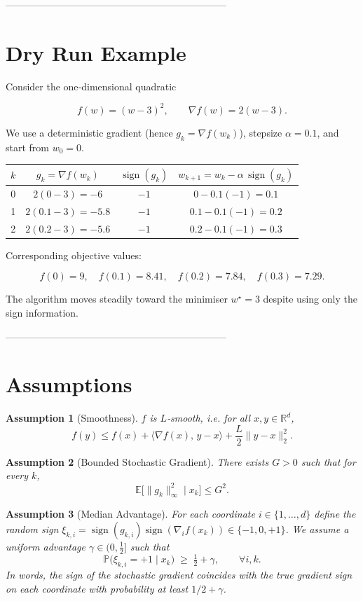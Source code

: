 \documentclass{article}
\newtheorem{assumption}{Assumption}
\newcommand{\sign}{\operatorname{sign}}
\begin{document}
--------------------------------------------------------------------

\section*{Dry Run Example}
Consider the one‑dimensional quadratic  

\[
f(w)=(w-3)^{2},\qquad \nabla f(w)=2(w-3).
\]

We use a deterministic gradient (hence $g_k=\nabla f(w_k)$), stepsize
$\alpha=0.1$, and start from $w_{0}=0$.

\begin{center}
\begin{tabular}{c|c|c|c}
$k$ & $g_k= \nabla f(w_k)$ & $\sign(g_k)$ & $w_{k+1}=w_k-\alpha\,\sign(g_k)$ \\ \hline
0 & $2(0-3)=-6$ & $-1$ & $0-0.1(-1)=0.1$ \\
1 & $2(0.1-3)=-5.8$ & $-1$ & $0.1-0.1(-1)=0.2$ \\
2 & $2(0.2-3)=-5.6$ & $-1$ & $0.2-0.1(-1)=0.3$
\end{tabular}
\end{center}

Corresponding objective values:

\[
f(0)=9,\quad f(0.1)=8.41,\quad f(0.2)=7.84,\quad f(0.3)=7.29.
\]

The algorithm moves steadily toward the minimiser $w^{\star}=3$ despite using only
the sign information.

--------------------------------------------------------------------

\section*{Assumptions}
\begin{assumption}[Smoothness]\label{ass:smooth}
$f$ is $L$‑smooth, i.e. for all $x,y\in\mathbb{R}^{d}$,
\[
f(y)\le f(x)+\langle\nabla f(x),\,y-x\rangle+\frac{L}{2}\|y-x\|_{2}^{2}.
\]
\end{assumption}

\begin{assumption}[Bounded Stochastic Gradient]\label{ass:bounded}
There exists $G>0$ such that for every $k$,
\[
\mathbb{E}\big[\|g_k\|_{\infty}^{2}\mid x_k\big]\le G^{2}.
\]
\end{assumption}

\begin{assumption}[Median Advantage]\label{ass:median}
For each coordinate $i\in\{1,\dots,d\}$ define the random sign
$\xi_{k,i}=\sign(g_{k,i})\sign(\nabla_{i}f(x_k))\in\{-1,0,+1\}$.
We assume a uniform advantage $\gamma\in(0,\tfrac12]$ such that
\[
\mathbb{P}\!\big(\xi_{k,i}=+1\mid x_k\big)\;\ge\;\tfrac12+\gamma,
\qquad\forall i,k .
\tag{A3}
\]
In words, the sign of the stochastic gradient coincides with the true
gradient sign on each coordinate with probability at least $1/2+\gamma$.
\end{assumption}
\end{document}
